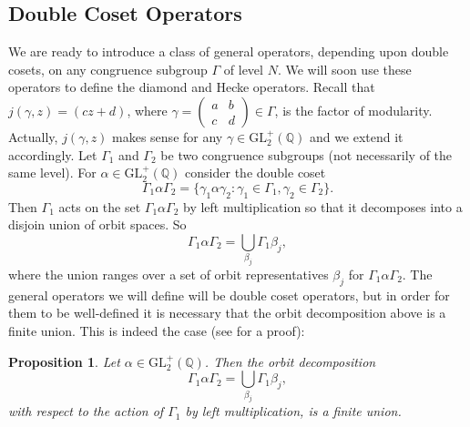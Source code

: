 \documentclass[12pt]{book}
\newtheorem{proposition}{Proposition}[section]
\theoremstyle{definition}\newframedtheorem{method}{Method}
\newcommand{\GL}{\mathrm{GL}}
\newcommand{\Q}{\mathbb{Q}}
\renewcommand{\a}{\alpha}
\renewcommand{\b}{\beta}
\newcommand{\g}{\gamma}
\newcommand{\G}{\Gamma}
\newcommand{\<}{\langle}
\renewcommand{\>}{\rangle}
\begin{document}
    \subsection*{Double Coset Operators}
      We are ready to introduce a class of general operators, depending upon double cosets, on any congruence subgroup $\G$ of level $N$. We will soon use these operators to define the diamond and Hecke operators. Recall that $j(\g,z) = (cz+d)$, where $\g = \begin{pmatrix} a & b \\ c & d \end{pmatrix} \in \G$, is the factor of modularity. Actually, $j(\g,z)$ makes sense for any $\g \in \GL_{2}^{+}(\Q)$ and we extend it accordingly. Let $\G_{1}$ and $\G_{2}$ be two congruence subgroups (not necessarily of the same level). For $\a \in \GL_{2}^{+}(\Q)$ consider the double coset
      \[
        \G_{1}\a\G_{2} = \{\g_{1}\a\g_{2}:\g_{1} \in \G_{1}, \g_{2} \in \G_{2}\}.
      \]
      Then $\G_{1}$ acts on the set $\G_{1}\a\G_{2}$ by left multiplication so that it decomposes into a disjoin union of orbit spaces. So
      \[
        \G_{1}\a\G_{2} = \bigcup_{\b_{j}}\G_{1}\b_{j},
      \]
      where the union ranges over a set of orbit representatives $\b_{j}$ for $\G_{1}\a\G_{2}$. The general operators we will define will be double coset operators, but in order for them to be well-defined it is necessary that the orbit decomposition above is a finite union. This is indeed the case (see \cite{diamond2005first} for a proof):

      \begin{proposition}\label{prop:double_congruence_subgroup_coset_decomposition_is_finite}
        Let $\a \in \GL_{2}^{+}(\Q)$. Then the orbit decomposition
        \[
          \G_{1}\a\G_{2} = \bigcup_{\b_{j}}\G_{1}\b_{j},
        \]
        with respect to the action of $\G_{1}$ by left multiplication, is a finite union.
      \end{proposition}
\end{document}
